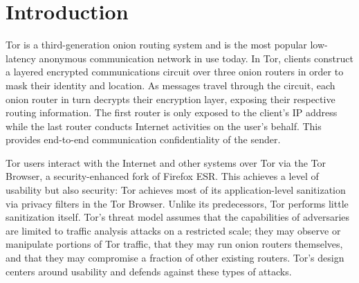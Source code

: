 \documentclass[USenglish,oneside,twocolumn]{article}
\begin{document}

 
\maketitle

\vspace{-30px}

\section{Introduction}

Tor \cite{dingledine2004tor} is a third-generation onion routing system and is the most popular low-latency anonymous communication network in use today. In Tor, clients construct a layered encrypted communications circuit over three onion routers in order to mask their identity and location. As messages travel through the circuit, each onion router in turn decrypts their encryption layer, exposing their respective routing information. The first router is only exposed to the client's IP address while the last router conducts Internet activities on the user's behalf. This provides end-to-end communication confidentiality of the sender. %


Tor users interact with the Internet and other systems over Tor via the Tor Browser, a security-enhanced fork of Firefox ESR. This achieves a level of usability but also security: Tor achieves most of its application-level sanitization via privacy filters in the Tor Browser. Unlike its predecessors, Tor performs little sanitization itself. Tor's threat model assumes that the capabilities of adversaries are limited to traffic analysis attacks on a restricted scale; they may observe or manipulate portions of Tor traffic, that they may run onion routers themselves, and that they may compromise a fraction of other existing routers. Tor's design centers around usability and defends against these types of attacks.
\end{document}
